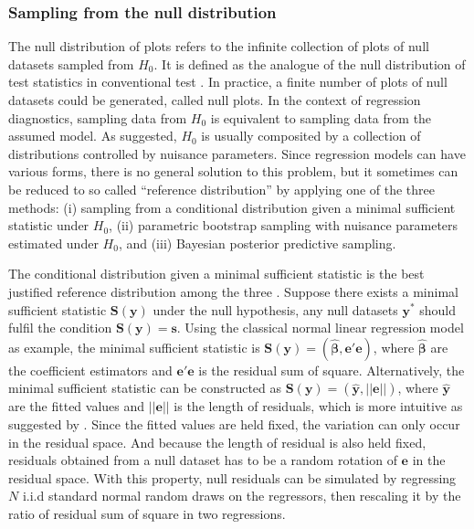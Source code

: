 \documentclass[]{interact}
\theoremstyle{plain}%
\theoremstyle{definition}
\theoremstyle{remark}
\begin{document}
\hypertarget{se:sampling-from-null}{%
\subsubsection{Sampling from the null
distribution}\label{se:sampling-from-null}}

The null distribution of plots refers to the infinite collection of
plots of null datasets sampled from \(H_0\). It is defined as the
analogue of the null distribution of test statistics in conventional
test \citep{buja_statistical_2009}. In practice, a finite number of
plots of null datasets could be generated, called null plots. In the
context of regression diagnostics, sampling data from \(H_0\) is
equivalent to sampling data from the assumed model. As
\citet{buja_statistical_2009} suggested, \(H_0\) is usually composited
by a collection of distributions controlled by nuisance parameters.
Since regression models can have various forms, there is no general
solution to this problem, but it sometimes can be reduced to so called
``reference distribution'' by applying one of the three methods: (i)
sampling from a conditional distribution given a minimal sufficient
statistic under \(H_0\), (ii) parametric bootstrap sampling with
nuisance parameters estimated under \(H_0\), and (iii) Bayesian
posterior predictive sampling.

The conditional distribution given a minimal sufficient statistic is the
best justified reference distribution among the three
\citep{buja_statistical_2009}. Suppose there exists a minimal sufficient
statistic \(\boldsymbol{S}(\boldsymbol{y})\) under the null hypothesis,
any null datasets \(\boldsymbol{y^{*}}\) should fulfil the condition
\(\boldsymbol{S}(\boldsymbol{y}) = \boldsymbol{s}\). Using the classical
normal linear regression model as example, the minimal sufficient
statistic is
\(\boldsymbol{S}(\boldsymbol{y}) = (\hat{\boldsymbol{\beta}}, \boldsymbol{e}'\boldsymbol{e})\),
where \(\hat{\boldsymbol{\beta}}\) are the coefficient estimators and
\(\boldsymbol{e}'\boldsymbol{e}\) is the residual sum of square.
Alternatively, the minimal sufficient statistic can be constructed as
\(\boldsymbol{S}(\boldsymbol{y}) = (\hat{\boldsymbol{y}}, ||\boldsymbol{e}||)\),
where \(\hat{\boldsymbol{y}}\) are the fitted values and
\(||\boldsymbol{e}||\) is the length of residuals, which is more
intuitive as suggested by \citet{buja_statistical_2009}. Since the
fitted values are held fixed, the variation can only occur in the
residual space. And because the length of residual is also held fixed,
residuals obtained from a null dataset has to be a random rotation of
\(\boldsymbol{e}\) in the residual space. With this property, null
residuals can be simulated by regressing \(N\) i.i.d standard normal
random draws on the regressors, then rescaling it by the ratio of
residual sum of square in two regressions.
\end{document}
